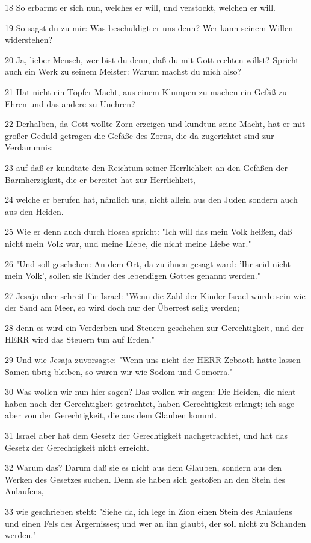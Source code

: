 \par 18 So erbarmt er sich nun, welches er will, und verstockt, welchen er will.
\par 19 So sagst du zu mir: Was beschuldigt er uns denn? Wer kann seinem Willen widerstehen?
\par 20 Ja, lieber Mensch, wer bist du denn, daß du mit Gott rechten willst? Spricht auch ein Werk zu seinem Meister: Warum machst du mich also?
\par 21 Hat nicht ein Töpfer Macht, aus einem Klumpen zu machen ein Gefäß zu Ehren und das andere zu Unehren?
\par 22 Derhalben, da Gott wollte Zorn erzeigen und kundtun seine Macht, hat er mit großer Geduld getragen die Gefäße des Zorns, die da zugerichtet sind zur Verdammnis;
\par 23 auf daß er kundtäte den Reichtum seiner Herrlichkeit an den Gefäßen der Barmherzigkeit, die er bereitet hat zur Herrlichkeit,
\par 24 welche er berufen hat, nämlich uns, nicht allein aus den Juden sondern auch aus den Heiden.
\par 25 Wie er denn auch durch Hosea spricht: "Ich will das mein Volk heißen, daß nicht mein Volk war, und meine Liebe, die nicht meine Liebe war."
\par 26 "Und soll geschehen: An dem Ort, da zu ihnen gesagt ward: 'Ihr seid nicht mein Volk', sollen sie Kinder des lebendigen Gottes genannt werden."
\par 27 Jesaja aber schreit für Israel: "Wenn die Zahl der Kinder Israel würde sein wie der Sand am Meer, so wird doch nur der Überrest selig werden;
\par 28 denn es wird ein Verderben und Steuern geschehen zur Gerechtigkeit, und der HERR wird das Steuern tun auf Erden."
\par 29 Und wie Jesaja zuvorsagte: "Wenn uns nicht der HERR Zebaoth hätte lassen Samen übrig bleiben, so wären wir wie Sodom und Gomorra."
\par 30 Was wollen wir nun hier sagen? Das wollen wir sagen: Die Heiden, die nicht haben nach der Gerechtigkeit getrachtet, haben Gerechtigkeit erlangt; ich sage aber von der Gerechtigkeit, die aus dem Glauben kommt.
\par 31 Israel aber hat dem Gesetz der Gerechtigkeit nachgetrachtet, und hat das Gesetz der Gerechtigkeit nicht erreicht.
\par 32 Warum das? Darum daß sie es nicht aus dem Glauben, sondern aus den Werken des Gesetzes suchen. Denn sie haben sich gestoßen an den Stein des Anlaufens,
\par 33 wie geschrieben steht: "Siehe da, ich lege in Zion einen Stein des Anlaufens und einen Fels des Ärgernisses; und wer an ihn glaubt, der soll nicht zu Schanden werden."

